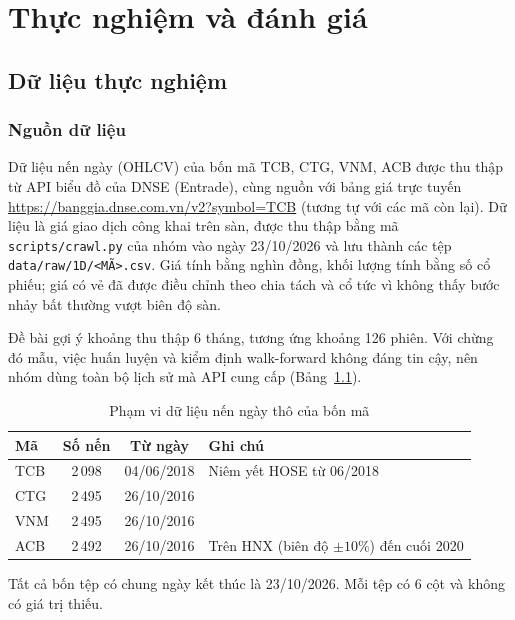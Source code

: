 \documentclass[12pt,a4paper,oneside]{report}
\begin{document}
\chapter{Thực nghiệm và đánh giá}
\label{chap:thucnghiem}

\section{Dữ liệu thực nghiệm}
\subsection{Nguồn dữ liệu}
Dữ liệu nến ngày (OHLCV) của bốn mã TCB, CTG, VNM, ACB được thu thập từ API
biểu đồ của DNSE (Entrade), cùng nguồn với bảng giá trực tuyến
\url{https://banggia.dnse.com.vn/v2?symbol=TCB} (tương tự với các mã còn lại).
Dữ liệu là giá giao dịch công khai trên sàn, được thu thập bằng mã
\texttt{scripts/crawl.py} của nhóm vào ngày 23/10/2026 và lưu thành các tệp
\texttt{data/raw/1D/<MÃ>.csv}. Giá tính bằng nghìn đồng, khối lượng tính bằng số
cổ phiếu; giá có vẻ đã được điều chỉnh theo chia tách và cổ tức vì không thấy
bước nhảy bất thường vượt biên độ sàn.

Đề bài gợi ý khoảng thu thập 6 tháng, tương ứng khoảng 126 phiên. Với chừng
đó mẫu, việc huấn luyện và kiểm định walk-forward không đáng tin cậy, nên nhóm
dùng toàn bộ lịch sử mà API cung cấp (Bảng~\ref{tab:phamvi}).

\begin{table}[H]
  \centering
  \caption{Phạm vi dữ liệu nến ngày thô của bốn mã}
  \label{tab:phamvi}
  \begin{tabular}{lccl}
    \toprule
    \textbf{Mã} & \textbf{Số nến} & \textbf{Từ ngày} & \textbf{Ghi chú} \\
    \midrule
    TCB & 2\,098 & 04/06/2018 & Niêm yết HOSE từ 06/2018 \\
    CTG & 2\,495 & 26/10/2016 & \\
    VNM & 2\,495 & 26/10/2016 & \\
    ACB & 2\,492 & 26/10/2016 & Trên HNX (biên độ $\pm 10\%$) đến cuối 2020 \\
    \bottomrule
  \end{tabular}
\end{table}

Tất cả bốn tệp có chung ngày kết thúc là 23/10/2026. Mỗi tệp có 6 cột và không
có giá trị thiếu.
\end{document}
